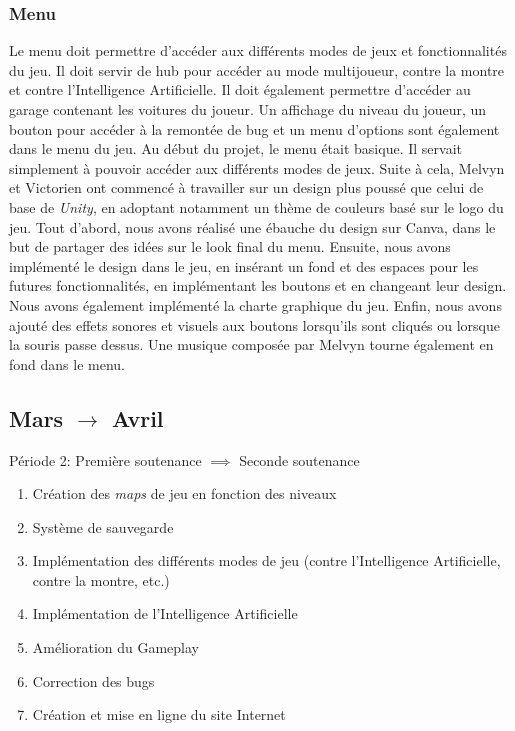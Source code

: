 \documentclass[a4paper,12pt]{article}
\newcommand{\AI}{Intelligence Artificielle}
\begin{document}
            \subsubsection{Menu}
                Le menu doit permettre d'accéder aux différents modes de jeux et fonctionnalités du jeu.
                Il doit servir de hub pour accéder au mode multijoueur, contre la montre et contre l'\AI.
                Il doit également permettre d'accéder au garage contenant les voitures du joueur. Un affichage
                du niveau du joueur, un bouton pour accéder à la remontée de bug et un menu d'options 
                sont également dans le menu du jeu. Au début du projet, le menu était basique. Il servait 
                simplement à pouvoir accéder aux différents modes de jeux. Suite à cela, Melvyn et Victorien 
                ont commencé à travailler sur un design plus poussé que celui de base de \textsl{Unity}, 
                en adoptant notamment un thème de couleurs basé sur le logo du jeu. Tout d'abord, nous avons 
                réalisé une ébauche du design sur Canva, dans le but de partager des idées sur le look
                final du menu. Ensuite, nous avons implémenté le design dans le jeu, en insérant un fond
                et des espaces pour les futures fonctionnalités, en implémentant les boutons et en changeant
                leur design. Nous avons également implémenté la charte graphique du jeu. Enfin, nous avons 
                ajouté des effets sonores et visuels aux boutons lorsqu'ils sont cliqués ou lorsque
                la souris passe dessus. Une musique composée par Melvyn tourne également en fond dans le menu.


        \subsection{Mars $\to$ Avril}
        
        \begin{description}
        \item Période 2: Première soutenance \(\implies\) Seconde soutenance
        \begin{enumerate}
            \item Création des \textit{maps} de jeu en fonction des niveaux
            \item Système de sauvegarde
            \item Implémentation des différents modes de jeu (contre l'\AI, contre la montre, etc.)
            \item Implémentation de l'\AI
            \item Amélioration du Gameplay
            \item Correction des bugs
            \item Création et mise en ligne du site Internet
                \\
        \end{enumerate}
    \end{description}
\end{document}
